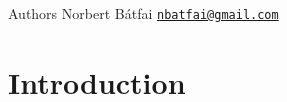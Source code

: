 \begin{DoxyAuthor}{Authors}
Norbert Bátfai \href{mailto:nbatfai@gmail.com}{\tt nbatfai@gmail.\-com}
\end{DoxyAuthor}
\hypertarget{index_intro}{}\section{Introduction}\label{index_intro}
